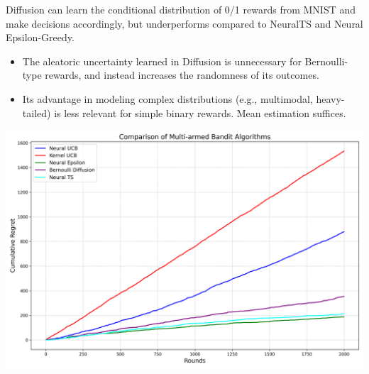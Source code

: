 Diffusion can learn the conditional distribution of 0/1 rewards from MNIST and make decisions accordingly, but underperforms compared to NeuralTS and Neural Epsilon-Greedy.
\begin{itemize}
    \item The aleatoric uncertainty learned in Diffusion is unnecessary for Bernoulli-type rewards, and instead increases the randomness of its outcomes.
    \item Its advantage in modeling complex distributions (e.g., multimodal, heavy-tailed) is less relevant for simple binary rewards. Mean estimation suffices.
\end{itemize}
        
\begin{tikzfigure}
    \includegraphics[width=\linewidth]{Img/context_compare.png}
\end{tikzfigure}